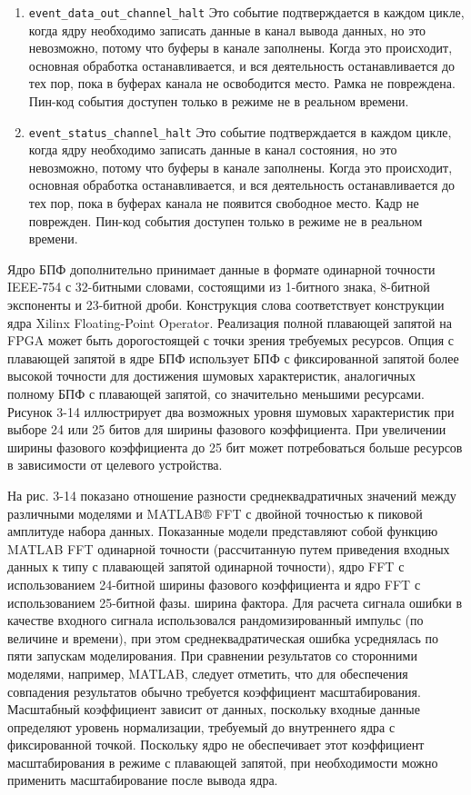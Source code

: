 \begin{enumerate}
	\item \verb|event_data_out_channel_halt|
	Это событие подтверждается в каждом цикле, когда ядру необходимо записать данные в канал вывода данных, но это невозможно, потому что буферы в канале заполнены. Когда это происходит, основная обработка останавливается, и вся деятельность останавливается до тех пор, пока в буферах канала не освободится место. Рамка не повреждена. Пин-код события доступен только в режиме не в реальном времени.
	\item \verb|event_status_channel_halt|
	Это событие подтверждается в каждом цикле, когда ядру необходимо записать данные в канал состояния, но это невозможно, потому что буферы в канале заполнены. Когда это происходит, основная обработка останавливается, и вся деятельность останавливается до тех пор, пока в буферах канала не появится свободное место. Кадр не поврежден. Пин-код события доступен только в режиме не в реальном времени.
\end{enumerate}

Ядро БПФ дополнительно принимает данные в формате одинарной точности IEEE-754 с 32-битными словами, состоящими из 1-битного знака, 8-битной экспоненты и 23-битной дроби. Конструкция слова соответствует конструкции ядра Xilinx Floating-Point Operator. Реализация полной плавающей запятой на FPGA может быть дорогостоящей с точки зрения требуемых ресурсов. Опция с плавающей запятой в ядре БПФ использует БПФ с фиксированной запятой более высокой точности для достижения шумовых характеристик, аналогичных полному БПФ с плавающей запятой, со значительно меньшими ресурсами. Рисунок 3-14 иллюстрирует два возможных уровня шумовых характеристик при выборе 24 или 25 битов для ширины фазового коэффициента. При увеличении ширины фазового коэффициента до 25 бит может потребоваться больше ресурсов в зависимости от целевого устройства.

На рис. 3-14 показано отношение разности среднеквадратичных значений между различными моделями и MATLAB® FFT с двойной точностью к пиковой амплитуде набора данных. Показанные модели представляют собой функцию MATLAB FFT одинарной точности (рассчитанную путем приведения входных данных к типу с плавающей запятой одинарной точности), ядро FFT с использованием 24-битной ширины фазового коэффициента и ядро FFT с использованием 25-битной фазы. ширина фактора. Для расчета сигнала ошибки в качестве входного сигнала использовался рандомизированный импульс (по величине и времени), при этом среднеквадратическая ошибка усреднялась по пяти запускам моделирования. При сравнении результатов со сторонними моделями, например, MATLAB, следует отметить, что для обеспечения совпадения результатов обычно требуется коэффициент масштабирования. Масштабный коэффициент зависит от данных, поскольку входные данные определяют уровень нормализации, требуемый до внутреннего ядра с фиксированной точкой. Поскольку ядро не обеспечивает этот коэффициент масштабирования в режиме с плавающей запятой, при необходимости можно применить масштабирование после вывода ядра.

